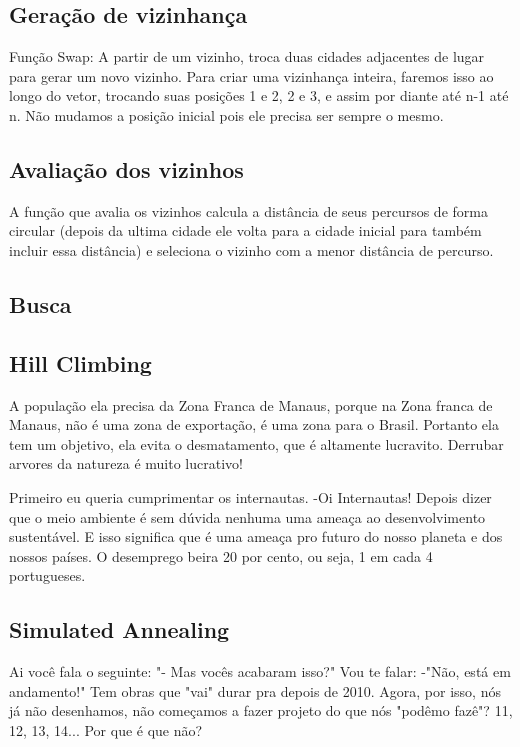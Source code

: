 \documentclass[12pt, a4paper]{article}
\begin{document}
	\subsection{Geração de vizinhança}
		Função Swap: A partir de um vizinho, troca duas cidades adjacentes de lugar para gerar um novo vizinho. Para criar uma vizinhança inteira, faremos isso ao longo do vetor, trocando suas posições 1 e 2, 2 e 3, e assim por diante até n-1 até n. Não mudamos a posição inicial pois ele precisa ser sempre o mesmo.
	
	\subsection{Avaliação dos vizinhos}
		A função que avalia os vizinhos calcula a distância de seus percursos de forma circular (depois da ultima cidade ele volta para a cidade inicial para também incluir essa distância) e seleciona o vizinho com a menor distância de percurso.
	
	\subsection{Busca}
		
		\subsection{Hill Climbing}
		A população ela precisa da Zona Franca de Manaus, porque na Zona franca de Manaus, não é uma zona de exportação, é uma zona para o Brasil. Portanto ela tem um objetivo, ela evita o desmatamento, que é altamente lucravito. Derrubar arvores da natureza é muito lucrativo!

		Primeiro eu queria cumprimentar os internautas. -Oi Internautas! Depois dizer que o meio ambiente é sem dúvida nenhuma uma ameaça ao desenvolvimento sustentável. E isso significa que é uma ameaça pro futuro do nosso planeta e dos nossos países. O desemprego beira 20 por cento, ou seja, 1 em cada 4 portugueses.
		
		\subsection{Simulated Annealing}
		Ai você fala o seguinte: "- Mas vocês acabaram isso?" Vou te falar: -"Não, está em andamento!" Tem obras que "vai" durar pra depois de 2010. Agora, por isso, nós já não desenhamos, não começamos a fazer projeto do que nós "podêmo fazê"? 11, 12, 13, 14... Por que é que não?
\end{document}
